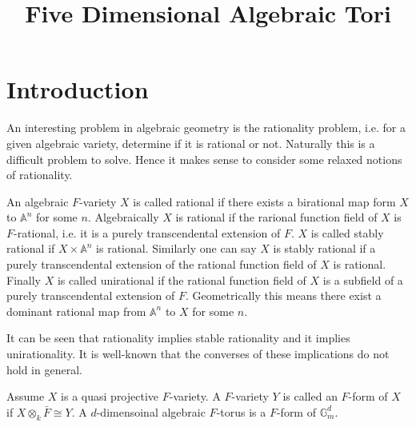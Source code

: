 \documentclass{article}
\title{Five Dimensional Algebraic Tori}
\theoremstyle{plain}
\theoremstyle{definition}
\begin{document}
\maketitle
{}
\section{Introduction}
An interesting problem in algebraic geometry is the rationality problem, i.e. 
for a given algebraic variety, determine if it is rational or not. Naturally 
this is a difficult problem to solve. Hence it makes sense to consider some 
relaxed notions of rationality. 

An algebraic $F$-variety $X$ is called rational if there exists a birational map 
form $X$ to $\mathbb{A}^n$ for some $n$. Algebraically $X$ is rational if 
the rarional function field of $X$ is $F$-rational, i.e. it is a purely 
transcendental extension of $F$. $X$ is called stably rational if $X \times 
\mathbb{A}^n$ is rational. Similarly one can say $X$ is stably rational if 
a purely transcendental extension of the rational function field of $X$ is 
rational. Finally $X$ is called unirational if the rational function field of 
$X$ is a subfield of a purely transcendental extension of $F$. Geometrically 
this means there exist a dominant rational map from $\mathbb{A}^n$ to $X$ for
some $n$. 

It can be seen that rationality implies stable rationality and it implies 
unirationality. It is well-known that the converses of these implications
do not hold in general. 

Assume $X$ is a quasi projective $F$-variety. A $F$-variety $Y$ is called an 
$F$-form of $X$ if $X \otimes_k \bar{F} \cong Y$. A $d$-dimensoinal algebraic 
$F$-torus is a $F$-form of $\mathbb{G}_m^d$.
\end{document}
